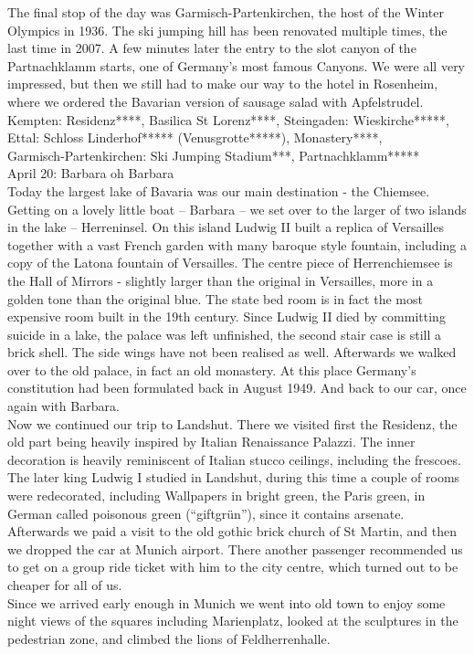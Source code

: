 The final stop of the day was Garmisch-Partenkirchen, the host of the Winter Olympics in 1936. The ski jumping hill has been renovated multiple times, the last time in 2007. A few minutes later the entry to the slot canyon of the Partnachklamm starts, one of Germany's most famous Canyons. We were all very impressed, but then we still had to make our way to the hotel in Rosenheim, where we ordered the Bavarian version of sausage salad with Apfelstrudel.\\

Kempten: Residenz****, Basilica St Lorenz****, Steingaden: Wieskirche*****, \\
Ettal: Schloss Linderhof***** (Venusgrotte*****), Monastery****,\\
 Garmisch-Partenkirchen: Ski Jumping Stadium***, Partnachklamm*****\\

April 20: Barbara oh Barbara\\
Today the largest lake of Bavaria was our main destination - the Chiemsee. Getting on a lovely little boat -- Barbara -- we set over to the larger of two islands in the lake -- Herreninsel. On this island Ludwig II built a replica of Versailles together with a vast French garden with many baroque style fountain, including a copy of the Latona fountain of Versailles. The centre piece of Herrenchiemsee is the Hall of Mirrors - slightly larger than the original in Versailles, more in a golden tone than the original blue. The state bed room is in fact the most expensive room built in the 19th century. Since Ludwig II died by committing suicide in a lake, the palace was left unfinished, the second stair case is still a brick shell. The side wings have not been realised as well. Afterwards we walked over to the old palace, in fact an old monastery. At this place Germany's constitution had been formulated back in August 1949. And back to our car, once again with Barbara.\\
Now we continued our trip to Landshut. There we visited first the Residenz, the old part being heavily inspired by Italian Renaissance Palazzi. The inner decoration is heavily reminiscent of Italian stucco ceilings, including the frescoes. The later king Ludwig I studied in Landshut, during this time a couple of rooms were redecorated, including Wallpapers in bright green, the Paris green, in German called poisonous green (``giftgr\"un''), since it contains arsenate. Afterwards we paid a visit to the old gothic brick church of St Martin, and then we dropped the car at Munich airport. There another passenger recommended us to get on a group ride ticket with him to the city centre, which turned out to be cheaper for all of us.\\
Since we arrived early enough in Munich we went into old town to enjoy some night views of the squares including Marienplatz, looked at the sculptures in the pedestrian zone, and climbed the lions of Feldherrenhalle.\\

